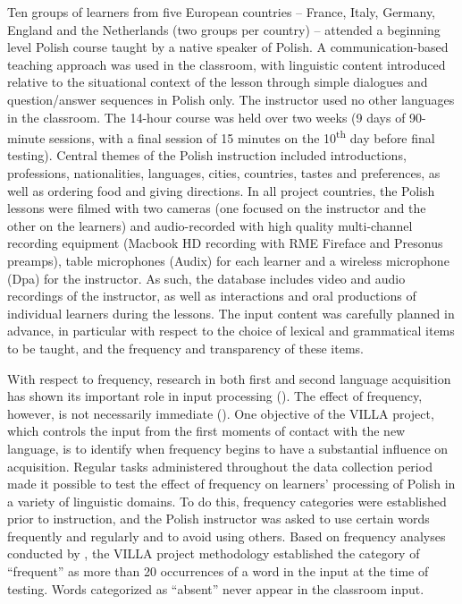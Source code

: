 \documentclass[output=paper,colorlinks,citecolor=brown,modfonts,nonflat]{../langscibook}
\begin{document}
Ten groups of learners from five European countries – France, Italy, Germany, England and the Netherlands (two groups per country) – attended a beginning level Polish course taught by a native speaker of Polish. A communication-based teaching approach was used in the classroom, with linguistic content introduced relative to the situational context of the lesson through simple dialogues and question/answer sequences in Polish only. The instructor used no other languages in the classroom. The 14-hour course was held over two weeks (9 days of 90-minute sessions, with a final session of 15 minutes on the 10\textsuperscript{th} day before final testing). Central themes of the Polish instruction included introductions, professions, nationalities, languages, cities, countries, tastes and preferences, as well as ordering food and giving directions. In all project countries, the Polish lessons were filmed with two cameras (one focused on the instructor and the other on the learners) and audio-recorded with high quality multi-channel recording equipment (Macbook HD recording with RME Fireface and Presonus preamps), table microphones (Audix) for each learner and a wireless microphone (Dpa) for the instructor. As such, the database includes video and audio recordings of the instructor, as well as interactions and oral productions of individual learners during the lessons. The input content was carefully planned in advance, in particular with respect to the choice of lexical and grammatical items to be taught, and the frequency and transparency of these items. 

With respect to frequency, research in both first and second language acquisition has shown its important role in input processing (\citealt{Slobin1985, BraineEtAl1990, Rott1999, Ellis2002, GullbergEtAl2010}). The effect of frequency, however, is not necessarily immediate (\citealt{Slobin1985,Rast2008}). One objective of the VILLA project, which controls the input from the first moments of contact with the new language, is to identify when frequency begins to have a substantial influence on acquisition. Regular tasks administered throughout the data collection period made it possible to test the effect of frequency on learners’ processing of Polish in a variety of linguistic domains. To do this, frequency categories were established prior to instruction, and the Polish instructor was asked to use certain words frequently and regularly and to avoid using others. Based on frequency analyses conducted by \citet{GoldschneiderDeKeyser2001}, the VILLA project methodology established the category of “frequent” as more than 20 occurrences of a word in the input at the time of testing. Words categorized as “absent” never appear in the classroom input.
\end{document}

